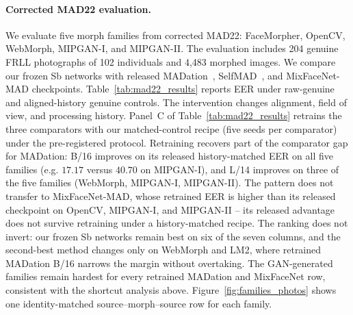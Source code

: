 \paragraph{Corrected MAD22 evaluation.}
We evaluate five morph families from corrected
MAD22: FaceMorpher, OpenCV, WebMorph, MIPGAN-I,
and MIPGAN-II. The evaluation includes 204 genuine FRLL photographs
of 102 individuals and 4,483 morphed images.
We compare our frozen Sb networks with released
MADation~\cite{caldeira2025madation},
SelfMAD~\cite{ivanovska2025selfmad}, and
MixFaceNet-MAD checkpoints. Table~\ref{tab:mad22_results} reports EER under
raw-genuine and aligned-history genuine controls.
The intervention changes alignment,
field of view, and processing history.
Panel~C of Table~\ref{tab:mad22_results} retrains the
three comparators with our matched-control
recipe (five seeds per comparator) under the
pre-registered protocol. Retraining recovers part of
the comparator gap for MADation: B/16 improves on its
released history-matched EER on all five families
(e.g. $17.17$ versus $40.70$ on MIPGAN-I), and L/14
improves on three of the five families
(WebMorph, MIPGAN-I, MIPGAN-II). The
pattern does not transfer to MixFaceNet-MAD, whose
retrained EER is higher than its released checkpoint
on OpenCV, MIPGAN-I, and MIPGAN-II -- its released
advantage does not survive retraining under a
history-matched recipe. The ranking does not invert:
our frozen Sb networks remain best on six of the seven
columns, and the second-best method changes only on
WebMorph and LM2, where retrained MADation B/16
narrows the margin without overtaking. The
GAN-generated families remain hardest for every
retrained MADation and MixFaceNet row, consistent
with the shortcut analysis above.
Figure~\ref{fig:families_photos} shows one
identity-matched source--morph--source row for
each family.


